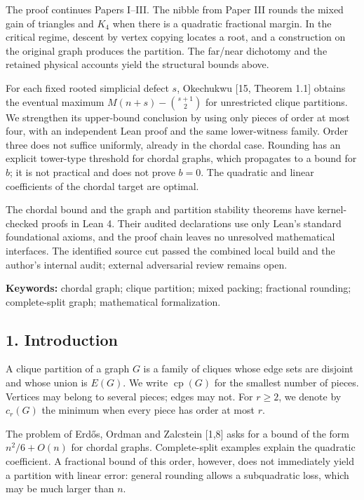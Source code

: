 \documentclass[english,11pt,a4paper]{article}
\begin{document}
The proof continues Papers I--III. The nibble from Paper III rounds the mixed gain of triangles and \(K_4\) when there is a quadratic fractional margin. In the critical regime, descent by vertex copying locates a root, and a construction on the original graph produces the partition. The far/near dichotomy and the retained physical accounts yield the structural bounds above.

For each fixed rooted simplicial defect \(s\), Okechukwu {[}15, Theorem 1.1{]} obtains the eventual maximum \(M(n+s)-\binom{s+1}{2}\) for unrestricted clique partitions. We strengthen its upper-bound conclusion by using only pieces of order at most four, with an independent Lean proof and the same lower-witness family. Order three does not suffice uniformly, already in the chordal case. Rounding has an explicit tower-type threshold for chordal graphs, which propagates to a bound for \(b\); it is not practical and does not prove \(b=0\). The quadratic and linear coefficients of the chordal target are optimal.

The chordal bound and the graph and partition stability theorems have kernel-checked proofs in Lean 4. Their audited declarations use only Lean's standard foundational axioms, and the proof chain leaves no unresolved mathematical interfaces. The identified source cut passed the combined local build and the author's internal audit; external adversarial review remains open.

\textbf{Keywords:} chordal graph; clique partition; mixed packing; fractional rounding; complete-split graph; mathematical formalization.

\subsection{1. Introduction}\label{introduction}

A clique partition of a graph \(G\) is a family of cliques whose edge sets are disjoint and whose union is \(E(G)\). We write \(\operatorname{cp}(G)\) for the smallest number of pieces. Vertices may belong to several pieces; edges may not. For \(r\ge2\), we denote by \(c_r(G)\) the minimum when every piece has order at most \(r\).

The problem of Erdős, Ordman and Zalcstein {[}1,8{]} asks for a bound of the form \(n^2/6+O(n)\) for chordal graphs. Complete-split examples explain the quadratic coefficient. A fractional bound of this order, however, does not immediately yield a partition with linear error: general rounding allows a subquadratic loss, which may be much larger than \(n\).
\end{document}
